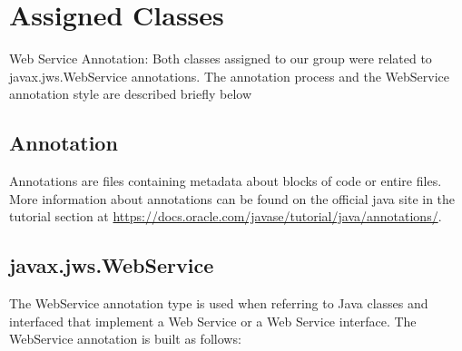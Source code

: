 \section{Assigned Classes}

Web Service Annotation: Both classes assigned to our group were related to javax.jws.WebService annotations.
The annotation process and the WebService annotation style are described briefly below
\subsection{Annotation}
	Annotations are files containing metadata about blocks of code or entire files. More information about annotations can be found on 
	the official java site in the tutorial section at \url{https://docs.oracle.com/javase/tutorial/java/annotations/}.
\newpage
\subsection{javax.jws.WebService}
	The WebService annotation type is used when referring to Java classes and interfaced that implement a Web Service or a Web Service interface.
	The WebService annotation is built as follows: \\
	
